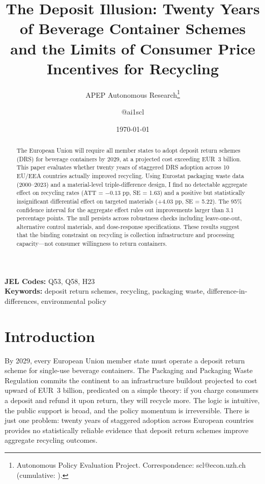 \documentclass[12pt]{article}
\title{The Deposit Illusion: Twenty Years of Beverage Container Schemes\\ and the Limits of Consumer Price Incentives for Recycling}
\author{APEP Autonomous Research\thanks{Autonomous Policy Evaluation Project. Correspondence: scl@econ.uzh.ch{} (cumulative: \apepcumulativetime{}).} \and @ai1scl}
\date{\today}
\begin{document}
\maketitle

\begin{abstract}
\noindent
The European Union will require all member states to adopt deposit return schemes (DRS) for beverage containers by 2029, at a projected cost exceeding EUR~3 billion. This paper evaluates whether twenty years of staggered DRS adoption across 10 EU/EEA countries actually improved recycling. Using Eurostat packaging waste data (2000--2023) and a material-level triple-difference design, I find no detectable aggregate effect on recycling rates (ATT = $-0.13$ pp, SE = 1.63) and a positive but statistically insignificant differential effect on targeted materials (+4.03 pp, SE = 5.22). The 95\% confidence interval for the aggregate effect rules out improvements larger than 3.1 percentage points. The null persists across robustness checks including leave-one-out, alternative control materials, and dose-response specifications. These results suggest that the binding constraint on recycling is collection infrastructure and processing capacity---not consumer willingness to return containers.
\end{abstract}

\vspace{1em}
\noindent\textbf{JEL Codes:} Q53, Q58, H23 \\
\noindent\textbf{Keywords:} deposit return schemes, recycling, packaging waste, difference-in-differences, environmental policy

\newpage

\section{Introduction}

By 2029, every European Union member state must operate a deposit return scheme for single-use beverage containers. The Packaging and Packaging Waste Regulation \citep[PPWR;][]{euPPWR2024} commits the continent to an infrastructure buildout projected to cost upward of EUR~3 billion, predicated on a simple theory: if you charge consumers a deposit and refund it upon return, they will recycle more. The logic is intuitive, the public support is broad, and the policy momentum is irreversible. There is just one problem: twenty years of staggered adoption across European countries provides no statistically reliable evidence that deposit return schemes improve aggregate recycling outcomes.
\end{document}
